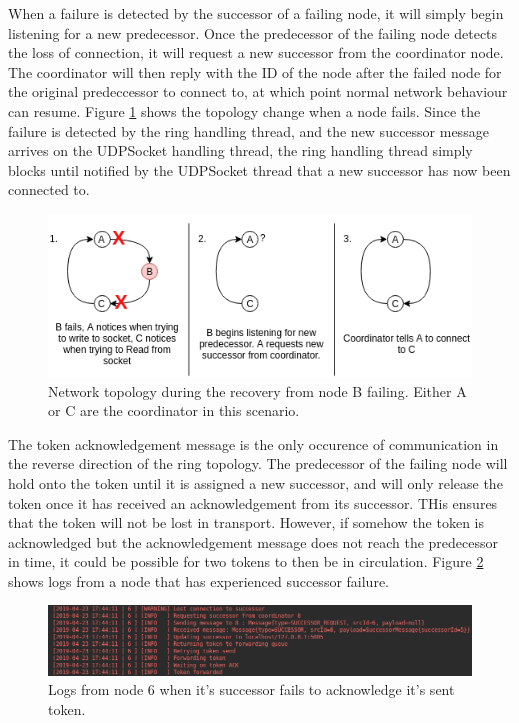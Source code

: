 \documentclass[12pt]{article}
\begin{document}
When a failure is detected by the successor of a failing node, it will simply begin listening for a new predecessor. Once the predecessor of the failing node detects the loss of connection, it will request a new successor from the coordinator node. The coordinator will then reply with the ID of the node after the failed node for the original predeccessor to connect to, at which point normal network behaviour can resume. Figure \ref{fig:failure} shows the topology change when a node fails. Since the failure is detected by the ring handling thread, and the new successor message arrives on the UDPSocket handling thread, the ring handling thread simply blocks until notified by the UDPSocket thread that a new successor has now been connected to. 

\begin{figure}[!ht]
	\centering
	\includegraphics[width=\linewidth]{images/failure}
	\caption{Network topology during the recovery from node B failing. Either A or C are the coordinator in this scenario.}
	\label{fig:failure}
\end{figure}

The token acknowledgement message is the only occurence of communication in the reverse direction of the ring topology. The predecessor of the failing node will hold onto the token until it is assigned a new successor, and will only release the token once it has received an acknowledgement from its successor. THis ensures that the token will not be lost in transport. However, if somehow the token is acknowledged but the acknowledgement message does not reach the predecessor in time, it could be possible for two tokens to then be in circulation. Figure \ref{fig:recovery} shows logs from a node that has experienced successor failure. 

\begin{figure}[!ht]
	\centering
	\includegraphics[width=\linewidth]{images/recovery}
	\caption{Logs from node 6 when it's successor fails to acknowledge it's sent token.}
	\label{fig:recovery}
\end{figure}
\end{document}
